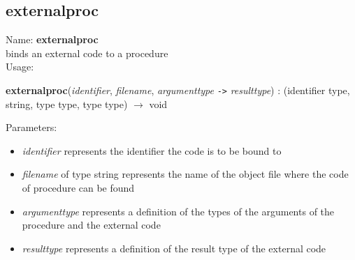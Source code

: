 \subsection{externalproc}
\label{labexternalproc}
\noindent Name: \textbf{externalproc}\\
\phantom{aaa}binds an external code to a \sollya procedure\\[0.2cm]
\noindent Usage: 
\begin{center}
\textbf{externalproc}(\emph{identifier}, \emph{filename}, \emph{argumenttype} \texttt{->} \emph{resulttype}) : (\textsf{identifier type}, \textsf{string}, \textsf{type type}, \textsf{type type}) $\rightarrow$ \textsf{void}\\
\end{center}
Parameters: 
\begin{itemize}
\item \emph{identifier} represents the identifier the code is to be bound to
\item \emph{filename} of type \textsf{string} represents the name of the object file where the code of procedure can be found
\item \emph{argumenttype} represents a definition of the types of the arguments of the \sollya procedure and the external code
\item \emph{resulttype} represents a definition of the result type of the external code
\end{itemize}
